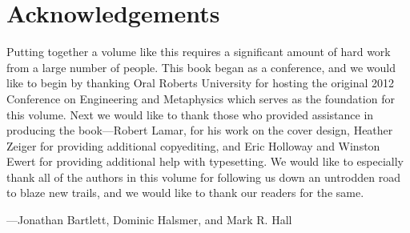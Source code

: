 \chapter*{Acknowledgements}

Putting together a volume like this requires a significant amount of hard work from a large number of people.  This book began as a conference, and we would like to begin by thanking Oral Roberts University for hosting the original 2012 Conference on Engineering and Metaphysics which serves as the foundation for this volume.  Next we would like to thank those who provided assistance in producing the book---Robert Lamar, for his work on the cover design, Heather Zeiger for providing additional copyediting, and Eric Holloway and Winston Ewert for providing additional help with typesetting.  We would like to especially thank all of the authors in this volume for following us down an untrodden road to blaze new trails, and we would like to thank our readers for the same.

\baselineskip

\hfill ---Jonathan Bartlett, Dominic Halsmer, and Mark R. Hall
